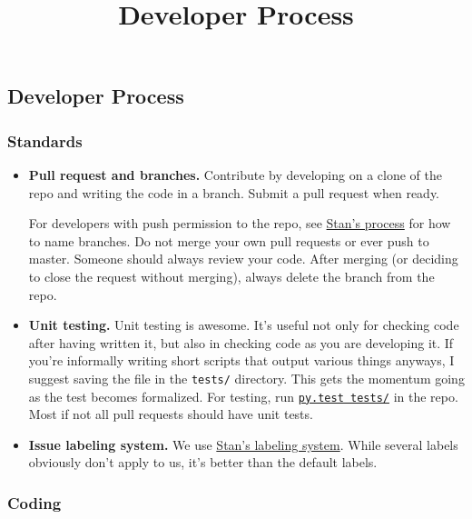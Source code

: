 \title{Developer Process}

\subsection{Developer Process}

\subsubsection{Standards}

\begin{itemize}
\item
  \textbf{Pull request and branches.}
  Contribute by developing on a clone of the repo and writing the code
  in a branch. Submit a pull request when ready.

  For developers with push permission to the repo, see
  \href{https://github.com/stan-dev/stan/wiki/Developer-Process#information-to-include-in-pull-request}{Stan's
  process} for how to name branches.  Do not merge your own pull
  requests or ever push to master. Someone should always review your
  code.  After merging (or deciding to close the request without
  merging), always delete the branch from the repo.
\item
  \textbf{Unit testing.} Unit testing is awesome. It's useful not only
  for checking code after having written it, but also in checking code
  as you are developing it. If you're informally writing short scripts
  that output various things anyways, I suggest saving the file in the
  \texttt{tests/} directory. This gets the momentum going as the test
  becomes formalized. For testing, run
  \href{http://doc.pytest.org/}{\texttt{py.test
  tests/}}
  in the repo. Most if not all pull requests should have unit tests.
\item
  \textbf{Issue labeling system.} We use
  \href{https://github.com/stan-dev/stan/issues}{Stan's labeling system}.
  While several labels obviously don't apply to us, it's better than the
  default labels.
\end{itemize}

\subsubsection{Coding}

